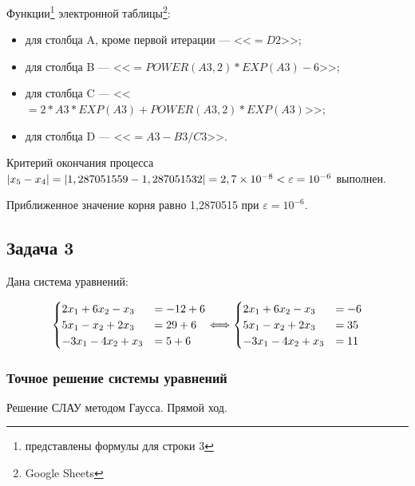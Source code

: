 \documentclass[10pt, a4paper, titlepage]{article}
\newcommand*{\hm}[1]{#1\nobreak\discretionary{}{\hbox{$\mathsurround=0pt #1$}}{}} %
\begin{document}
Функции\footnote{представлены формулы для строки 3} электронной таблицы\footnote{Google Sheets}:
\begin{itemize}
    \item для столбца A, кроме первой итерации --- <<$=D2$>>;
    
    \item для столбца B --- <<$=POWER(A3,2)*EXP(A3)-6$>>;
    
    \item для столбца C --- <<$=2*A3*EXP(A3)+POWER(A3,2)*EXP(A3)$>>;
    
    \item для столбца D --- <<$=A3-B3/C3$>>.
\end{itemize}

Критерий окончания процесса $|x_5-x_4|=|1,287051559-1,287051532 | \hm =2,7\times10^{-8}<\varepsilon=10^{-6}$ выполнен. 

Приближенное значение корня равно 1,2870515 при $\varepsilon=10^{-6}$.

\subsection{Задача 3}

Дана система уравнений:

\begin{equation*}
    \begin{cases}
        $$2x_1+6x_2-x_3 &= -12+6$$ \\
        $$5x_1-x_2+2x_3 &= 29+6$$ \\
        $$-3x_1-4x_2+x_3 &= 5+6$$
    \end{cases}
    \Longleftrightarrow
    \begin{cases}
        $$2x_1+6x_2-x_3 &= -6$$ \\
        $$5x_1-x_2+2x_3 &= 35$$ \\
        $$-3x_1-4x_2+x_3 &= 11$$
    \end{cases}
\end{equation*}


\subsubsection*{Точное решение системы уравнений}

Решение СЛАУ методом Гаусса. Прямой ход.
\end{document}
